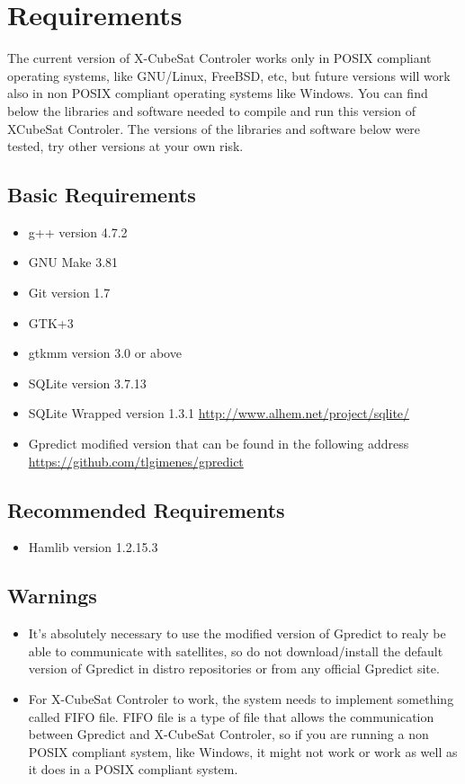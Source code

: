 \documentclass[pdftex,11pt,a4paper,titlepage]{report}
\begin{document}
\chapter{Requirements}
\hspace{0.4cm} The current version of X-CubeSat Controler works only in POSIX compliant operating systems, like GNU/Linux, FreeBSD, etc, but future versions will work also in non POSIX compliant operating systems like Windows. You can find below the libraries and software needed to compile and run this version of XCubeSat Controler. The versions of the libraries and software below were tested, try other versions at your own risk.

\section{Basic Requirements}
\begin{itemize}
\item g++ version 4.7.2
\item GNU Make 3.81
\item Git version 1.7
\item GTK+3 
\item gtkmm version 3.0 or above
\item SQLite version 3.7.13
\item SQLite Wrapped version 1.3.1 \url{http://www.alhem.net/project/sqlite/}
\item Gpredict modified version that can be found in the following address \url{https://github.com/tlgimenes/gpredict} 
\end{itemize}

\section{Recommended Requirements}
\begin{itemize}
\item Hamlib version 1.2.15.3
\end{itemize}

\section{Warnings}
\begin{itemize}
\item It's absolutely necessary to use the modified version of Gpredict to realy be able to communicate with satellites, so do not download/install
the default version of Gpredict in distro repositories or from any official Gpredict site. 
\item For X-CubeSat Controler to work, the system needs to implement something called FIFO file. FIFO file is a type of file that allows the communication between Gpredict and X-CubeSat Controler, so if you are running a non POSIX compliant system, like Windows, it might not work or work as well as it does in a POSIX compliant system.
\end{itemize}
\end{document}
